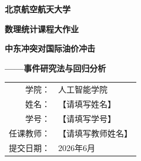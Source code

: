 \documentclass[UTF8,zihao=-4,a4paper]{ctexart}
\begin{document}
\hypersetup{pageanchor=false}
\begin{titlepage}
  \centering
  \vspace*{1.2cm}
  {\bfseries 北京航空航天大学\par}
  \vspace{0.7cm}
  {\bfseries 数理统计课程大作业\par}
  \vspace{2.2cm}
  {\bfseries 中东冲突对国际油价冲击\par}
  \vspace{0.4cm}
  {\bfseries ——事件研究法与回归分析\par}
  \vfill
  \renewcommand{\arraystretch}{1.7}
  \begin{tabular}{rl}
    学院： & 人工智能学院 \\
    姓名： & 【请填写姓名】 \\
    学号： & 【请填写学号】 \\
    任课教师： & 【请填写教师姓名】 \\
    提交日期： & 2026年6月 \\
  \end{tabular}
  \vfill
\end{titlepage}

\hypersetup{pageanchor=true}
\begin{abstract}
本文研究2025年至2026年中东冲突升级对国际原油价格的短期冲击。研究使用FRED口径的WTI与Brent日度价格构造对数收益率，并结合ACLED中东周度汇总数据刻画冲突背景。在对新闻来源进行核验后，选取5个重大事件，采用市场模型估计正常收益，计算$[-1,+1]$、$[0,+3]$与$[0,+5]$三个窗口的累计异常收益（CAR），并实施显著性检验。进一步使用中断时间序列模型（ITS）分解即时水平变化与事件后趋势变化，通过Durbin--Watson检验、Breusch--Pagan检验和Newey--West稳健标准误评估回归推断的可靠性，并采用分段回归与BIC进行结构断点近似识别。

结果表明，不同事件、不同油价基准与不同事件窗口之间存在明显异质性。在主窗口$[0,+3]$中，2026年3月13日哈尔克岛及石油出口设施风险事件对应的Brent CAR为$13.552\%$，WTI相对Brent的CAR为$-10.198\%$；两者在Bonferroni和Benjamini--Hochberg修正后仍显著。ITS结果显示，2026年2月28日冲突升级对Brent收益率产生显著正向水平变化，而结构断点集中出现在2026年2月底至3月初。研究说明，中东冲突并不会机械地导致所有油价基准同向上涨；市场反应取决于事件是否直接威胁供应链、风险是否已被提前定价，以及所使用正常收益基准的含义。

\noindent\textbf{关键词：}中东冲突；国际油价；事件研究法；累计异常收益；中断时间序列；结构断点
\end{abstract}
\end{document}

